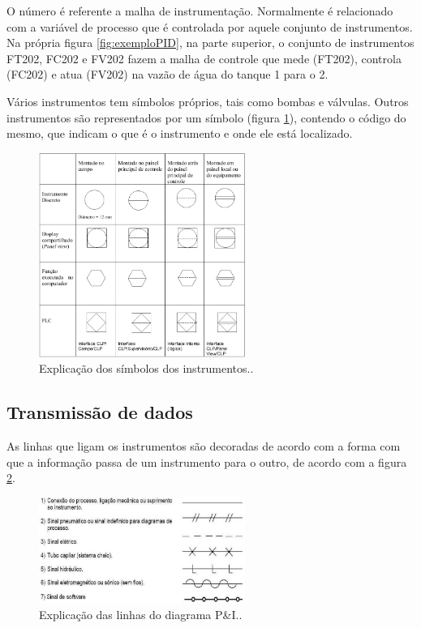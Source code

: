 O número é referente a malha de instrumentação. Normalmente é relacionado com a variável de processo que é controlada por aquele conjunto de instrumentos. Na própria figura \ref{fig:exemploPID}, na parte superior, o conjunto de instrumentos FT202, FC202 e FV202 fazem a malha de controle que mede (FT202), controla (FC202) e atua (FV202) na vazão de água do tanque 1 para o 2.

Vários instrumentos tem símbolos próprios, tais como bombas e válvulas. Outros instrumentos são representados por um símbolo (figura \ref{fig:simbolosISA}), contendo o código do mesmo, que indicam o que é o instrumento e onde ele está localizado.
\begin{figure}[h]
  \centering
  \includegraphics[width = 0.6\textwidth]{figuras/simbolosISA}
  \caption{Explicação dos símbolos dos instrumentos.\label{fig:simbolosISA}.}
\end{figure}

\subsection{Transmissão de dados}
\label{sub:TransmissaoDeDados}

As linhas que ligam os instrumentos são decoradas de acordo com a forma com que a informação passa de um instrumento para o outro, de acordo com a figura \ref{fig:linhasISA}.
\begin{figure}[h]
  \centering
  \includegraphics[width = 0.6\textwidth]{figuras/linhasISA}
  \caption{Explicação das linhas do diagrama P\&I.\label{fig:linhasISA}.}
\end{figure}

